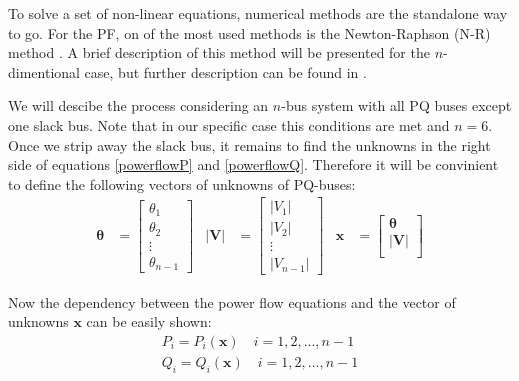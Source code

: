 \documentclass[a4paper,11pt, titlepage, twoside]{article}
\begin{document}
To solve a set of non-linear equations, numerical methods are the standalone way to go. For the PF, on of the most used methods is the Newton-Raphson (N-R) method \cite{NRusual}. A brief description of this method will be presented for the $n$-dimentional case, but further description can be found in \cite{llibrebase}.

We will descibe the process considering an $n$-bus system with all PQ buses except one slack bus. Note that in our specific case this conditions are met and $n = 6$. Once we strip away the slack bus, it remains to find the unknowns in the right side of equations \ref{powerflowP} and \ref{powerflowQ}. Therefore it will be convinient to
define the following vectors of unknowns of PQ-buses:
\begin{equation}
\begin{aligned}
    \mathbf{\theta} &= \begin{bmatrix}
    \theta_1 \\
    \theta_2 \\
    \vdots \\
    \theta_{n-1}
    \end{bmatrix} &
    \mathbf{|V|} &= \begin{bmatrix}
    |V_1| \\
    |V_2| \\
    \vdots \\
    |V_{n-1}|
    \end{bmatrix} &
    \mathbf{x} &= \begin{bmatrix}
    \mathbf{\theta} \\
    \mathbf{|V|} \\
    \end{bmatrix}
\end{aligned}
\end{equation}

Now the dependency between the power flow equations and the vector of unknowns $\mathbf{x}$ can be easily shown:
\begin{subequations}
\begin{align}
    P_i = P_i(\mathbf{x}) \quad i = 1,2,...,n-1 \\
    Q_i = Q_i(\mathbf{x}) \quad i = 1,2,...,n-1
\end{align}       
\end{subequations}
\end{document}
